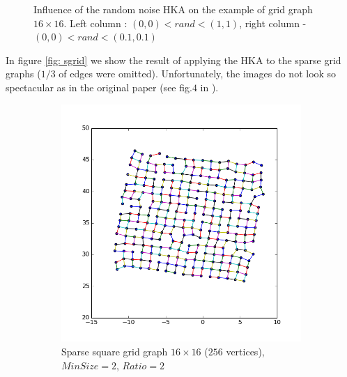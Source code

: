 \documentclass[12pt,a4paper]{article}
\begin{document}
\begin{figure} [htb]
\caption{Influence of the random noise HKA on the example of grid graph $16\times16$. Left column : $(0,0)<rand<(1,1)$, right column - $(0,0)<rand<(0.1,0.1)$}
\label{fig: compareRand}
\end{figure}	

\FloatBarrier

In figure \ref{fig: sgrid} we show the result of applying the HKA to the sparse grid graphs ($1/3$ of edges were omitted). Unfortunately, the images do not look so spectacular as in the original paper (see fig.$4$ in \cite{DavidHarel2002}).
\begin{figure}[htb]
	 \begin{subfigure}{0.5\textwidth}
		   \centering
           \includegraphics[scale=0.45]{results_Harel/HK_sgrid16x16_m2r2.png}
           \caption{Sparse square grid graph $16\times 16$ ($256$ vertices), $MinSize=2$, $Ratio=2$}
     \end{subfigure}
	 \begin{subfigure}{0.5\textwidth}
			\centering

\end{subfigure}
\end{figure}
\end{document}
